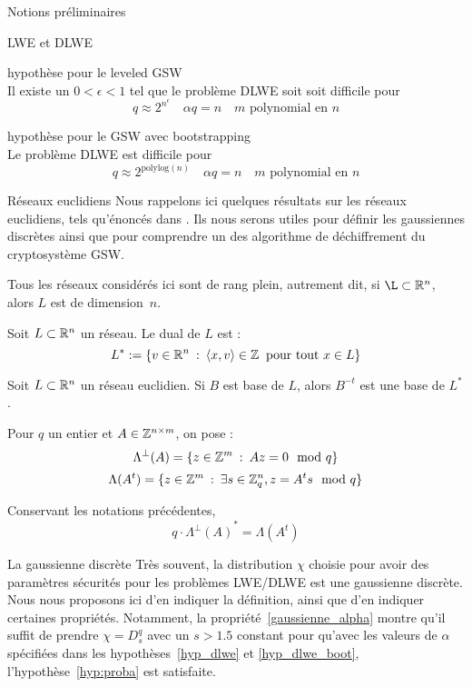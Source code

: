 \begin{section}{Notions préliminaires}
\begin{subsection}{LWE et DLWE}
	\begin{hyp}{hypothèse pour le leveled GSW} \\
	\label{hyp_dlwe}
	Il existe un $0 < \epsilon < 1$ tel que le problème DLWE soit
	soit difficile pour 
	\[ q \approx 2^{n^\epsilon}\quad \alpha q = n\quad \text{$m$ polynomial en $n$}\]
	\end{hyp}

	\begin{hyp}{hypothèse pour le GSW avec bootstrapping} \\
	\label{hyp_dlwe_boot}
	Le problème DLWE est difficile pour 
	\[ q \approx 2^\text{polylog$(n)$}\quad \alpha q = n\quad \text{$m$ polynomial en $n$}\]
	\end{hyp}


	\end{subsection}
	\begin{subsection}{Réseaux euclidiens}
	Nous rappelons ici quelques résultats sur les réseaux euclidiens, tels qu'énoncés dans \cite{EC:MicPei12}. Ils nous serons utiles pour définir les gaussiennes discrètes ainsi que pour comprendre un des algorithme de déchiffrement du cryptosystème GSW.

	Tous les réseaux considérés ici sont de rang plein, autrement dit, si $\L \subset \RR^n$, alors $L$ est de
	dimension \nolinebreak$n$.

	\begin{definition}
	Soit $L\subset \mathbb{R}^n$ un réseau. Le dual de $L$ est :
	\[ L^* := \{ v \in \mathbb{R}^n \::\: \langle x, v \rangle \in \mathbb{Z}
	   \:\text{ pour tout } x\in L\} \]
	\end{definition}
	\begin{prop} 
	Soit $L \subset \mathbb{R}^n$ un réseau euclidien. Si $B$ est base de $L$, alors
	$B^{-t}$ est une base de $L^*$.
	\end{prop}

	Pour $q$ un entier et $A \in \mathbb{Z}^{n\times m}$, on pose :
		\[\Lambda^\bot(A) = \{ z \in \mathbb{Z}^m\: :\: A z  = 0 \mod q \}\] 
	\[\Lambda(A^t) = \{ z \in \mathbb{Z}^m\: : \: \exists s\in \mathbb{Z}_q^n, z = A^t s \mod q\}\]

		\begin{prop} \label{lambda_reseau}
	Conservant les notations précédentes, 
	\[q \cdot {\Lambda^\bot(A)}^* =  \Lambda(A^t)\] 
	\end{prop}
	\end{subsection}
	
	\begin{subsection}{La gaussienne discrète}
Très souvent, la distribution $\chi$ choisie pour avoir des paramètres sécurités pour les problèmes LWE/DLWE est une
gaussienne discrète. Nous nous proposons ici d'en indiquer la définition, ainsi que d'en indiquer certaines propriétés.
Notamment, la propriété~\ref{gaussienne_alpha} montre qu'il suffit de prendre $\chi = D^q_s$ avec un $s > 1.5$ constant
pour qu'avec les valeurs de $\alpha$ spécifiées dans les hypothèses~\ref{hyp_dlwe} et
\ref{hyp_dlwe_boot}, 
l'hypothèse~\ref{hyp:proba} est satisfaite.


\end{subsection}
\end{section}

